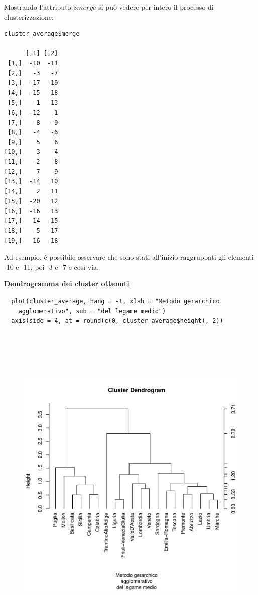 Mostrando l'attributo $\$merge$ si può vedere per intero il processo di clusterizzazione:

\vspace{5mm}
\begin{lstlisting}
cluster_average$merge

      [,1] [,2]
 [1,]  -10  -11
 [2,]   -3   -7
 [3,]  -17  -19
 [4,]  -15  -18
 [5,]   -1  -13
 [6,]  -12    1
 [7,]   -8   -9
 [8,]   -4   -6
 [9,]    5    6
[10,]    3    4
[11,]   -2    8
[12,]    7    9
[13,]  -14   10
[14,]    2   11
[15,]  -20   12
[16,]  -16   13
[17,]   14   15
[18,]   -5   17
[19,]   16   18
\end{lstlisting}
\vspace{5mm}

Ad esempio, è possibile osservare che sono stati all'inizio raggruppati gli elementi -10 e -11, poi -3 e -7 e così via.

\noindent \textbf{Dendrogramma dei cluster ottenuti}

\vspace{5mm}
\begin{lstlisting}
  plot(cluster_average, hang = -1, xlab = "Metodo gerarchico
    agglomerativo", sub = "del legame medio")
  axis(side = 4, at = round(c(0, cluster_average$height), 2))
\end{lstlisting}
\vspace{5mm}

\vspace{5mm}
\begin{figure}[!htbp]
    \centering
    \includegraphics[height=16cm]{ProgettoSAD/capitoli/images/clustering/dendro_cl_medio.pdf}
\end{figure}
\vspace{5mm}

